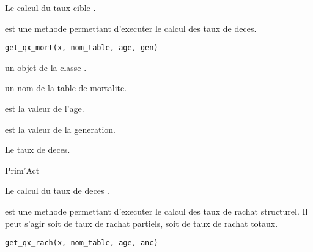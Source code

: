 \documentclass[a4paper]{book}
\begin{document}
%
\begin{SeeAlso}\relax
Le calcul du taux cible .
\end{SeeAlso}
%
\begin{Description}\relax
{} est une methode permettant d'executer le calcul des taux de deces.
\end{Description}
%
\begin{Usage}
\begin{verbatim}
get_qx_mort(x, nom_table, age, gen)
\end{verbatim}
\end{Usage}
%
\begin{Arguments}
\begin{ldescription}
\item[\code{x}] un objet de la classe .

\item[\code{nom\_table}] un nom de la table de mortalite.

\item[\code{age}] est la valeur  de l'age.

\item[\code{gen}] est la valeur  de la generation.
\end{ldescription}
\end{Arguments}
%
\begin{Value}
Le taux de deces.
\end{Value}
%
\begin{Author}\relax
Prim'Act
\end{Author}
%
\begin{SeeAlso}\relax
Le calcul du taux de deces .
\end{SeeAlso}
%
\begin{Description}\relax
{} est une methode permettant d'executer le calcul des taux de rachat structurel. Il
peut s'agir soit de taux de rachat partiels, soit de taux de rachat totaux.
\end{Description}
%
\begin{Usage}
\begin{verbatim}
get_qx_rach(x, nom_table, age, anc)
\end{verbatim}
\end{Usage}
\end{document}
